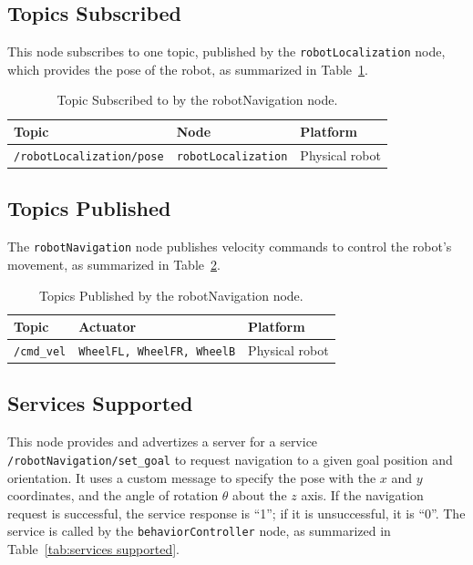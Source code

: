 \documentclass{CSSRforAfrica}
\begin{document}
\subsection*{Topics Subscribed}
This node subscribes to one topic, published by the \verb|robotLocalization| node, which provides the
pose of the robot, as summarized in Table~\ref{tab:topics subscribed}.

\begin{table}[H]
\centering
\caption{Topic Subscribed to by the robotNavigation node.}
\label{tab:topics subscribed}
\begin{tabularx}{\textwidth}{|l|l|X|}
\hline
\textbf{Topic} & \textbf{Node} & \textbf{Platform} \\ \hline
\verb|/robotLocalization/pose| & \verb|robotLocalization| & Physical robot \\ \hline
\end{tabularx}
\end{table}


\subsection*{Topics Published}
The \verb|robotNavigation| node publishes velocity commands to control the robot's movement, as summarized in Table~\ref{tab:topics published}.

\begin{table}[H]
\centering
\caption{Topics Published by the robotNavigation node.}
\label{tab:topics published}
\begin{tabularx}{\textwidth}{|l|l|X|}
\hline
\textbf{Topic} & \textbf{Actuator} & \textbf{Platform} \\ \hline
\texttt{/cmd\_vel} & \verb|WheelFL, WheelFR, WheelB| & Physical robot \\ \hline
\end{tabularx}
\end{table}

\subsection*{Services Supported}
This node provides and advertizes a server for a service \verb|/robotNavigation/set_goal| to request navigation to a given goal position and orientation. It uses a custom message to specify the pose with the $x$ and $y$ coordinates, and the angle of rotation $\theta$ about the $z$ axis. If the navigation request is successful, the service response is “1”; if it is unsuccessful, it is “0”. The service is called by the \verb|behaviorController| node, as summarized in Table~\ref{tab:services supported}.
\end{document}
